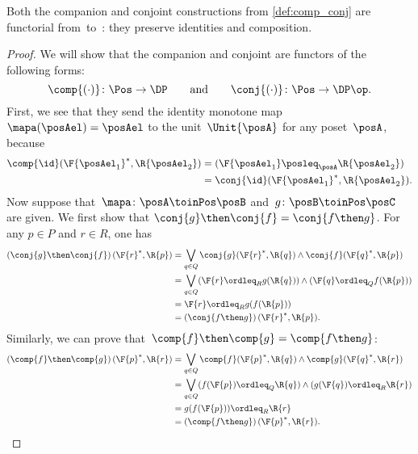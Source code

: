 \begin{lemma}
  \label{prop:comp_conj}
  Both the companion and conjoint constructions from \cref{def:comp_conj} are functorial from~\Pos to~\DP: they preserve identities and composition.
\end{lemma}
\begin{proof}
  We will show that the companion and conjoint are functors of the following forms:
  \begin{equation}
    \comp{(\cdot)}\colon\Pos\to\DP
    \qquad\text{and}\qquad
    \conj{(\cdot)}\colon\Pos\to\DP\op.
  \end{equation}
  First, we see that they send the identity monotone map~$\mapa(\posAel)=\posAel$ to the unit~$\Unit{\posA }$ for any poset~$\posA $, because
  \begin{equation}
    \begin{aligned}
      \comp{\id}(\F{\posAel_1}^*,\R{\posAel_2})&= (\F{\posAel_1} \posleq_{\posA} \R{\posAel_2})\\
      &=\conj{\id}(\F{\posAel_1}^*,\R{\posAel_2}).
    \end{aligned}
  \end{equation}
  Now suppose that~$\mapa\colon  \posA \toinPos \posB $ and~$g\colon \posB \toinPos \posC$ are given. We first show that $\conj{g}\then\conj{f}=\conj{f\then g}$.
  For any $p\in P$ and $r\in R$, one has
  \begin{equation}
    \begin{aligned}
      \left(\conj{g}\then \conj{f}\right)(\F{r}^*,\R{p})
      &=\bigvee_{q\in Q} \conj{g}(\F{r}^*,\R{q})\wedge\conj{f}(\F{q}^*,\R{p})\\
      &=\bigvee_{q\in Q} (\F{r}\ordleq_R g(\R{q})) \wedge (\F{q}\ordleq_Q f(\R{p})) \\
      &= \F{r}\ordleq_R g(f(\R{p}))\\
      &=\left(\conj{f\then g}\right)(\F{r}^*,\R{p}).
    \end{aligned}
  \end{equation}
  Similarly, we can prove that~$\comp{f}\then \comp{g}=\comp{f\then g}$:
  \begin{equation}
    \begin{aligned}
      \left(\comp{f}\then \comp{g}\right)(\F{p}^*,\R{r})&=\bigvee_{q\in Q} \comp{f}(\F{p}^*,\R{q})\wedge\comp{g}(\F{q}^*,\R{r})\\
      &=\bigvee_{q\in Q} (f(\F{p})\ordleq_Q \R{q})\wedge (g(\F{q})\ordleq_R \R{r})\\
      &=g(f(\F{p}))\ordleq_R \R{r}\\
      &=\left(\comp{f\then g}\right)(\F{p}^*,\R{r}).
    \end{aligned}
  \end{equation}
\end{proof}

